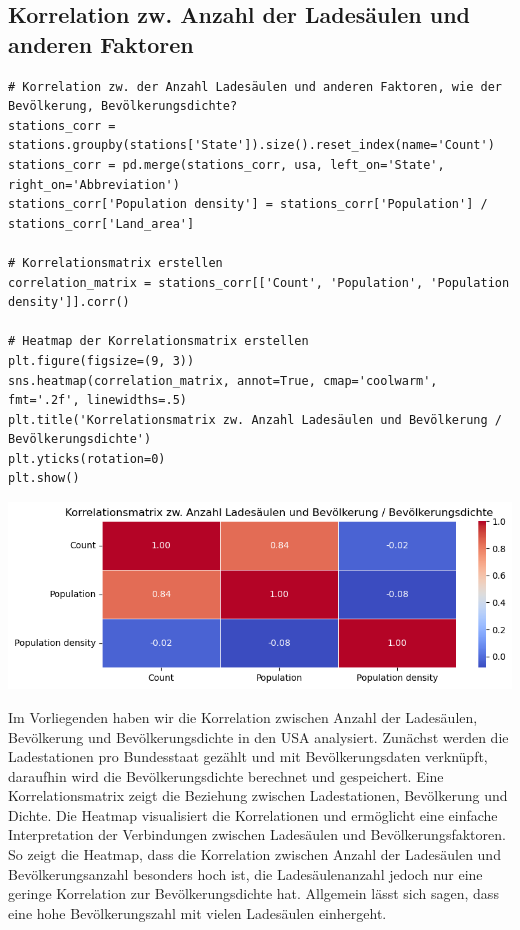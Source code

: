\subsection{Korrelation zw. Anzahl der Ladesäulen und anderen Faktoren}

\begin{verbatim}
# Korrelation zw. der Anzahl Ladesäulen und anderen Faktoren, wie der Bevölkerung, Bevölkerungsdichte?
stations_corr = stations.groupby(stations['State']).size().reset_index(name='Count')
stations_corr = pd.merge(stations_corr, usa, left_on='State', right_on='Abbreviation')
stations_corr['Population density'] = stations_corr['Population'] / stations_corr['Land_area']

# Korrelationsmatrix erstellen
correlation_matrix = stations_corr[['Count', 'Population', 'Population density']].corr()

# Heatmap der Korrelationsmatrix erstellen
plt.figure(figsize=(9, 3))
sns.heatmap(correlation_matrix, annot=True, cmap='coolwarm', fmt='.2f', linewidths=.5)
plt.title('Korrelationsmatrix zw. Anzahl Ladesäulen und Bevölkerung / Bevölkerungsdichte')
plt.yticks(rotation=0)
plt.show()
\end{verbatim}

\begin{center}
\includegraphics[scale=0.5]{img/output_7_0.png}
\end{center}

Im Vorliegenden haben wir die Korrelation zwischen Anzahl der Ladesäulen, Bevölkerung und Bevölkerungsdichte in den USA analysiert. Zunächst werden die Ladestationen pro Bundesstaat gezählt und mit Bevölkerungsdaten verknüpft, daraufhin wird die Bevölkerungsdichte berechnet und gespeichert. Eine Korrelationsmatrix zeigt die Beziehung zwischen Ladestationen, Bevölkerung und Dichte. Die Heatmap visualisiert die Korrelationen und ermöglicht eine einfache Interpretation der Verbindungen zwischen Ladesäulen und Bevölkerungsfaktoren. 
So zeigt die Heatmap, dass die Korrelation zwischen Anzahl der Ladesäulen und Bevölkerungsanzahl besonders hoch ist, die Ladesäulenanzahl jedoch nur eine geringe Korrelation zur Bevölkerungsdichte hat. Allgemein lässt sich sagen, dass eine hohe Bevölkerungszahl mit vielen Ladesäulen einhergeht.

